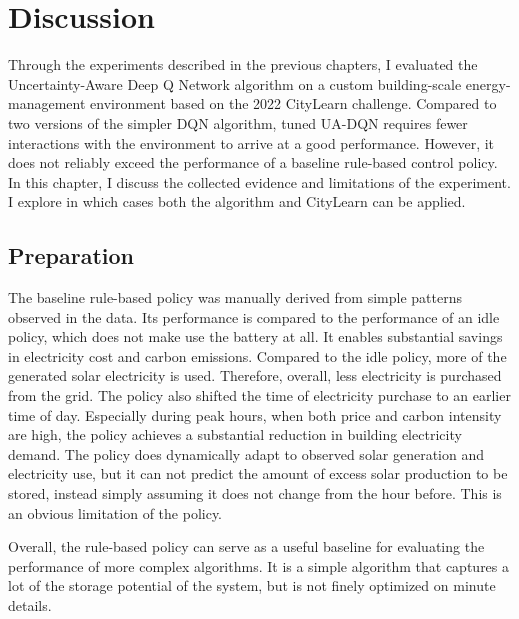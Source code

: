 
\chapter{Discussion}
  \label{Discussion}

Through the experiments described in the previous chapters, I evaluated the Uncertainty-Aware Deep Q Network algorithm on a custom building-scale energy-management environment based on the 2022 CityLearn challenge.
Compared to two versions of the simpler DQN algorithm, tuned UA-DQN requires fewer interactions with the environment to arrive at a good performance.
However, it does not reliably exceed the performance of a baseline rule-based control policy.
In this chapter, I discuss the collected evidence and limitations of the experiment.
I explore in which cases both the algorithm and CityLearn can be applied. 

\section{Preparation}
The baseline rule-based policy was manually derived from simple patterns observed in the data.
Its performance is compared to the performance of an idle policy, which does not make use the battery at all.
It enables substantial savings in electricity cost and carbon emissions.
Compared to the idle policy, more of the generated solar electricity is used. 
Therefore, overall, less electricity is purchased from the grid.
The policy also shifted the time of electricity purchase to an earlier time of day.
Especially during peak hours, when both price and carbon intensity are high, the policy achieves a substantial reduction in building electricity demand.
The policy does dynamically adapt to observed solar generation and electricity use, but it can not predict the amount of excess solar production to be stored, instead simply assuming it does not change from the hour before.
This is an obvious limitation of the policy.

Overall, the rule-based policy can serve as a useful baseline for evaluating the performance of more complex algorithms.
It is a simple algorithm that captures a lot of the storage potential of the system, but is not finely optimized on minute details.

